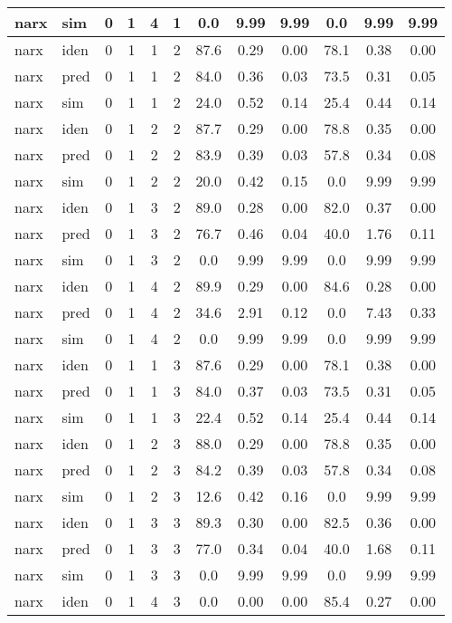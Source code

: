 \begin{landscape}
\begin{center}
\begin{longtable}{ll|cccc|ccc|ccc}
narx & sim & 0 & 1 & 4 & 1 & 0.0 & 9.99 & 9.99 & 0.0 & 9.99 & 9.99 \\ 
 \hline 
narx & iden & 0 & 1 & 1 & 2 & 87.6 & 0.29 & 0.00 & 78.1 & 0.38 & 0.00 \\ 
narx & pred & 0 & 1 & 1 & 2 & 84.0 & 0.36 & 0.03 & 73.5 & 0.31 & 0.05 \\ 
narx & sim & 0 & 1 & 1 & 2 & 24.0 & 0.52 & 0.14 & 25.4 & 0.44 & 0.14 \\ 
 \hline 
narx & iden & 0 & 1 & 2 & 2 & 87.7 & 0.29 & 0.00 & 78.8 & 0.35 & 0.00 \\ 
narx & pred & 0 & 1 & 2 & 2 & 83.9 & 0.39 & 0.03 & 57.8 & 0.34 & 0.08 \\ 
narx & sim & 0 & 1 & 2 & 2 & 20.0 & 0.42 & 0.15 & 0.0 & 9.99 & 9.99 \\ 
 \hline 
narx & iden & 0 & 1 & 3 & 2 & 89.0 & 0.28 & 0.00 & 82.0 & 0.37 & 0.00 \\ 
narx & pred & 0 & 1 & 3 & 2 & 76.7 & 0.46 & 0.04 & 40.0 & 1.76 & 0.11 \\ 
narx & sim & 0 & 1 & 3 & 2 & 0.0 & 9.99 & 9.99 & 0.0 & 9.99 & 9.99 \\ 
 \hline 
narx & iden & 0 & 1 & 4 & 2 & 89.9 & 0.29 & 0.00 & 84.6 & 0.28 & 0.00 \\ 
narx & pred & 0 & 1 & 4 & 2 & 34.6 & 2.91 & 0.12 & 0.0 & 7.43 & 0.33 \\ 
narx & sim & 0 & 1 & 4 & 2 & 0.0 & 9.99 & 9.99 & 0.0 & 9.99 & 9.99 \\ 
 \hline 
narx & iden & 0 & 1 & 1 & 3 & 87.6 & 0.29 & 0.00 & 78.1 & 0.38 & 0.00 \\ 
narx & pred & 0 & 1 & 1 & 3 & 84.0 & 0.37 & 0.03 & 73.5 & 0.31 & 0.05 \\ 
narx & sim & 0 & 1 & 1 & 3 & 22.4 & 0.52 & 0.14 & 25.4 & 0.44 & 0.14 \\ 
 \hline 
narx & iden & 0 & 1 & 2 & 3 & 88.0 & 0.29 & 0.00 & 78.8 & 0.35 & 0.00 \\ 
narx & pred & 0 & 1 & 2 & 3 & 84.2 & 0.39 & 0.03 & 57.8 & 0.34 & 0.08 \\ 
narx & sim & 0 & 1 & 2 & 3 & 12.6 & 0.42 & 0.16 & 0.0 & 9.99 & 9.99 \\ 
 \hline 
narx & iden & 0 & 1 & 3 & 3 & 89.3 & 0.30 & 0.00 & 82.5 & 0.36 & 0.00 \\ 
narx & pred & 0 & 1 & 3 & 3 & 77.0 & 0.34 & 0.04 & 40.0 & 1.68 & 0.11 \\ 
narx & sim & 0 & 1 & 3 & 3 & 0.0 & 9.99 & 9.99 & 0.0 & 9.99 & 9.99 \\ 
 \hline 
narx & iden & 0 & 1 & 4 & 3 & 0.0 & 0.00 & 0.00 & 85.4 & 0.27 & 0.00 \\ 

\end{longtable}
\end{center}
\end{landscape}
